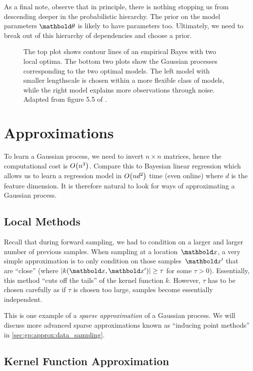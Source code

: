 As a final note, observe that in principle, there is nothing stopping us from descending deeper in the probabilistic hierarchy.
The prior on the model parameters $\vtheta$ is likely to have parameters too.
Ultimately, we need to break out of this hierarchy of dependencies and choose a prior.

\begin{figure}
  \caption{The top plot shows contour lines of an empirical Bayes with two local optima.
  The bottom two plots show the Gaussian processes corresponding to the two optimal models.
  The left model with smaller lengthscale is chosen within a more flexible class of models, while the right model explains more observations through noise.
  Adapted from figure 5.5 of .}\label{fig:empirical_bayes}
\end{figure}


\section{Approximations}\label{sec:gp:approximations}

To learn a Gaussian process, we need to invert $n \times n$ matrices, hence the computational cost is $\BigO{n^3}$.
Compare this to Bayesian linear regression which allows us to learn a regression model in $\BigO{n d^2}$ time (even online) where $d$ is the feature dimension.
It is therefore natural to look for ways of approximating a Gaussian process.

\subsection{Local Methods}

Recall that during forward sampling, we had to condition on a larger and larger number of previous samples.
When sampling at a location~$\vx$, a very simple approximation is to only condition on those samples~$\vxp$ that are ``close'' (where $\abs{k(\vx, \vxp)} \geq \tau$ for some $\tau > 0$).
Essentially, this method ``cuts off the tails'' of the kernel function $k$.
However, $\tau$ has to be chosen carefully as if $\tau$ is chosen too large, samples become essentially independent.

This is one example of a \emph{sparse approximation} of a Gaussian process.
We will discuss more advanced sparse approximations known as ``inducing point methods'' in \cref{sec:gp:approx:data_sampling}.

\subsection{Kernel Function Approximation}\label{sec:gp:approximations:kernel}

